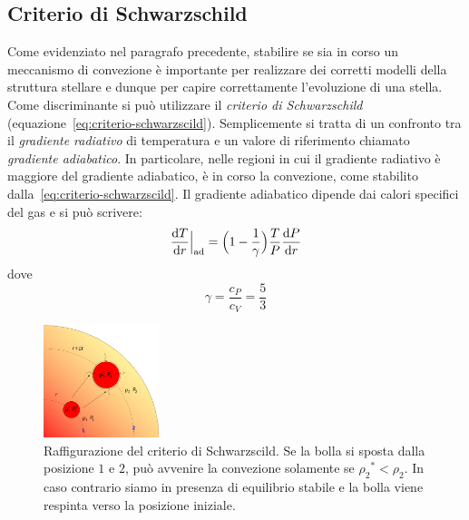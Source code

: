 \subsection{Criterio di Schwarzschild}
Come evidenziato nel paragrafo precedente, stabilire se sia in corso un meccanismo di convezione è importante per realizzare dei corretti modelli della struttura stellare e dunque per capire correttamente l'evoluzione di una stella. Come discriminante si può utilizzare il \emph{criterio di Schwarzschild} (equazione~\eqref{eq:criterio-schwarzscild}). Semplicemente si tratta di un confronto tra il \emph{gradiente radiativo} di temperatura e un valore di riferimento chiamato \emph{gradiente adiabatico}. In particolare, nelle regioni in cui il gradiente radiativo è maggiore del gradiente adiabatico, è in corso la convezione, come stabilito dalla~\eqref{eq:criterio-schwarzscild}. Il gradiente adiabatico dipende dai calori specifici del gas e si può scrivere:
\begin{equation}\label{eq:gradiente-adiabatico}
    \dfrac{\mathop{\mathrm{{}d}}\mathopen{} T}{\mathop{\mathrm{{}d}}\mathopen{} r}\Big|_\textup{ad} = \Bigl(1- \frac{1}{\gamma}\Bigr) \dfrac{T}{P} \dfrac{\mathop{\mathrm{{}d}}\mathopen{} P}{\mathop{\mathrm{{}d}}\mathopen{} r}
\end{equation}
dove
\[
\gamma =\frac{c_P}{c_V} = \frac{5}{3}
\]

\begin{figure}
\centering
\includegraphics[width=0.3\textwidth]{immagini/criterio-schwarzscild.png}
\caption{Raffigurazione del criterio di Schwarzscild. Se la bolla si sposta dalla posizione $1$ e $2$, può avvenire la convezione solamente se ${\rho_2}^* < \rho_2$. In caso contrario siamo in presenza di equilibrio stabile e la bolla viene respinta verso la posizione iniziale.}
\label{fig:criterio-schwarzscild}
\end{figure}


